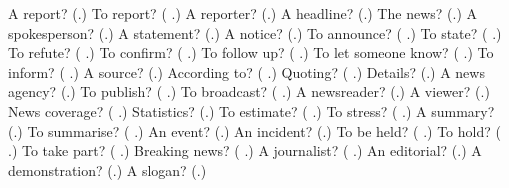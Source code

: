 \begin{tcolorbox}[breakable,colback=teal!4,colframe=teal!35!black,title={Before you move on}]
A report? (\textbf{}.) To report? (\textbf{ }.) A reporter? (\textbf{}.) A headline? (\textbf{}.) The news? (\textbf{}.) A spokesperson? (\textbf{}.) A statement? (\textbf{}.) A notice? (\textbf{}.) To announce? (\textbf{ }.) To state? (\textbf{ }.) To refute? (\textbf{ }.) To confirm? (\textbf{ }.) To follow up? (\textbf{ }.) To let someone know? (\textbf{ }.) To inform? (\textbf{ }.) A source? (\textbf{}.) According to? (\textbf{ }.) Quoting? (\textbf{  }.) Details? (\textbf{}.) A news agency? (\textbf{}.) To publish? (\textbf{ }.) To broadcast? (\textbf{ }.) A newsreader? (\textbf{}.) A viewer? (\textbf{}.) News coverage? (\textbf{ }.) Statistics? (\textbf{}.) To estimate? (\textbf{ }.) To stress? (\textbf{ }.) A summary? (\textbf{}.) To summarise? (\textbf{ }.) An event? (\textbf{}.) An incident? (\textbf{}.) To be held? (\textbf{ }.) To hold? (\textbf{ }.) To take part? (\textbf{ }.) Breaking news? (\textbf{ }.) A journalist? (\textbf{ }.) An editorial? (\textbf{}.) A demonstration? (\textbf{}.) A slogan? (\textbf{}.)
\end{tcolorbox}
